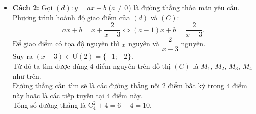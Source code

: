 \begin{ex}
{\begin{itemchoice}
\begin{itemize}
			Mỗi cách chọn $2$ trong $4$ điểm trên là một tổ hợp chập $2$ của $4$.\\
			Suy ra có $\mathrm{C}_4^2 = 6$ đường thẳng đi qua $2$ trong $4$ điểm trên (đều có điểm chung nguyên).\\
			Ngoài ra, tại mỗi điểm $M_i$ nói trên, ta kẻ được $1$ tiếp tuyến với đồ thị (các tiếp tuyến này không song song với $Oy$).\\ Điểm chung của tiếp tuyến và $(C)$ chính là tiếp điểm có tọa độ nguyên.\\
			Suy ra có thêm $4$ đường thẳng là tiếp tuyến tại $4$ điểm này.\\
			Vậy có tất cả $6 + 4 = 10$ đường thẳng thỏa mãn (lưu ý kiểm tra lại các đường thẳng này đều không song song với $Oy$).
			\item \textbf{Cách 2:} Gọi $(d)\colon y = ax+b$ ($a\neq 0$) là đường thẳng thỏa mãn yêu cầu.\\
			Phương trình hoành độ giao điểm của $(d)$ và $(C)$:
			\[ax+b = x + \dfrac{2}{x-3} \Leftrightarrow (a-1)x + b = \dfrac{2}{x-3}.\]
			Để giao điểm có tọa độ nguyên thì $x$ nguyên và $\dfrac{2}{x-3}$ nguyên.\\ Suy ra $(x-3) \in \text{Ư}(2) = \{\pm 1; \pm 2\}$.\\
			Từ đó ta tìm được đúng $4$ điểm nguyên trên đồ thị $(C)$ là $M_1$, $M_2$, $M_3$, $M_4$ như trên.\\
			Đường thẳng cần tìm sẽ là các đường thẳng nối $2$ điểm bất kỳ trong $4$ điểm này hoặc là các tiếp tuyến tại $4$ điểm này.\\
			Tổng số đường thẳng là $\mathrm{C}_4^2 + 4 = 6+4=10$.
			\end{itemize}
		\end{itemchoice}
	}
\end{ex}

\caukq


